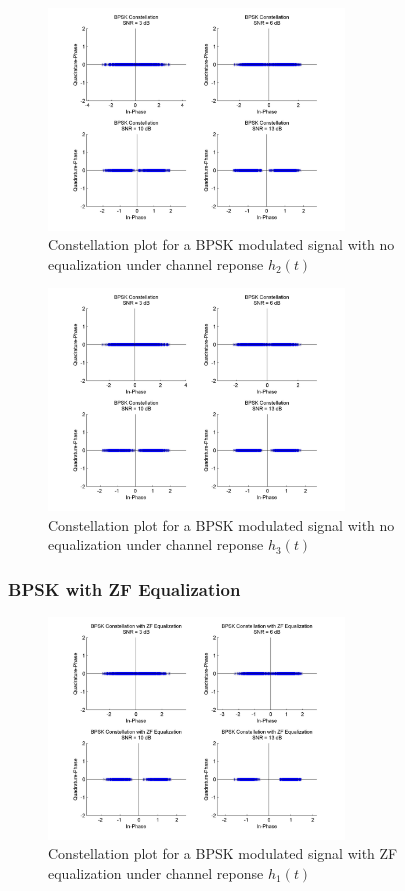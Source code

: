 \documentclass[]{article}
\begin{document}
\begin{figure}[H]
\centering
\includegraphics[width=0.7\textwidth]{bpConst2.jpg}
\caption{Constellation plot for a BPSK modulated signal with no equalization under channel reponse $h_2(t)$}
\end{figure}

\begin{figure}[H]
\centering
\includegraphics[width=0.7\textwidth]{bpConst3.jpg}
\caption{Constellation plot for a BPSK modulated signal with no equalization under channel reponse $h_3(t)$}
\end{figure}

\subsubsection{BPSK with ZF Equalization}

\begin{figure}[H]
\centering
\includegraphics[width=0.7\textwidth]{bpConstZF1.jpg}
\caption{Constellation plot for a BPSK modulated signal with ZF equalization under channel reponse $h_1(t)$}
\end{figure}
\end{document}
